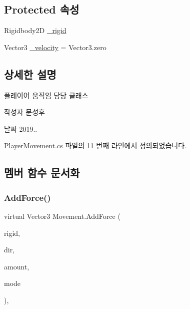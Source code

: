 \subsection*{Protected 속성}
\begin{DoxyCompactItemize}
\item 
Rigidbody2D \mbox{\hyperlink{class_movement_a8b24a93b5f529e53c668ff81bde13c0d}{\+\_\+rigid}}
\item 
Vector3 \mbox{\hyperlink{class_movement_a6ea6768262f1dca968be8ee5c14a0cc1}{\+\_\+velocity}} = Vector3.\+zero
\end{DoxyCompactItemize}


\subsection{상세한 설명}
플레이어 움직임 담당 클래스 

\begin{DoxyAuthor}{작성자}
문성후 
\end{DoxyAuthor}
\begin{DoxyDate}{날짜}
2019.. 
\end{DoxyDate}


Player\+Movement.\+cs 파일의 11 번째 라인에서 정의되었습니다.



\subsection{멤버 함수 문서화}
\mbox{\label{class_movement_ab0b20a2f058e2eed15f4bdf0503a2566}} 
\subsubsection{\texorpdfstring{AddForce()}{AddForce()}}
{\footnotesize\ttfamily virtual Vector3 Movement.\+Add\+Force (\begin{DoxyParamCaption}\item[{Rigidbody2D}]{rigid,  }\item[{Vector3}]{dir,  }\item[{float}]{amount,  }\item[{Force\+Mode2D}]{mode }\end{DoxyParamCaption})\hspace{0.3cm}{\ttfamily [virtual]}, {\ttfamily [inherited]}}



